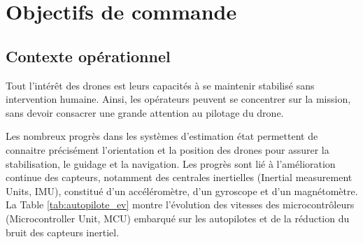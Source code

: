 \chapter{Objectifs de commande}
\minitoc
\label{chap:objectif}

\section{Contexte opérationnel}
Tout l'intérêt des drones est leurs capacités à se maintenir stabilisé sans intervention humaine. Ainsi, les opérateurs peuvent se concentrer sur la mission, sans devoir consacrer une grande attention au pilotage du drone. 

Les nombreux progrès dans les systèmes d'estimation état permettent de connaitre précisément l'orientation et la position des drones pour assurer la stabilisation, le guidage et la navigation. Les progrès sont lié à l'amélioration continue des capteurs, notamment des centrales inertielles (Inertial measurement Units, IMU),  constitué d'un accéléromètre, d'un gyroscope et d'un magnétomètre. La Table \ref{tab:autopilote_ev} montre l'évolution des vitesses des microcontrôleurs (Microcontroller Unit, MCU)  embarqué sur les autopilotes et de la réduction du bruit des capteurs inertiel.
